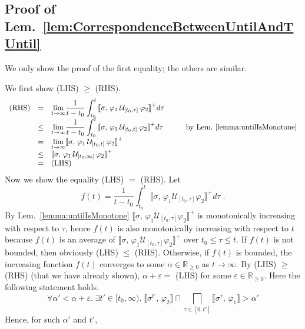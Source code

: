 \documentclass[envcountsect,orivec]{llncs} \usepackage{etex} \usepackage[]{graphicx}
\newcommand{\R}{{\mathbb{R}}}
\newcommand{\UntilOp}[1]{\mathbin{\mathcal{U}_{#1}}}
\newcommand{\Robust}[2]{{ \llbracket #1,\, #2 \rrbracket}}
\newcommand{\Lim}[1]{{\displaystyle{\lim_{#1}}}}
\newcommand{\Wedge}[1]{{{\bigsqcap_{#1}}}}
\newcommand{\Frac}[2]{{\displaystyle{\frac{#1}{#2}}}}
\newcommand{\Int}{\displaystyle \int}
\newcommand{\Rnn}{\R_{\ge 0}}
\begin{document}
\subsection{Proof of Lem.~\ref{lem:CorrespondenceBetweenUntilAndTUntil}}
\begin{myproof}
  We only show the proof of the first equality; the others are similar.
  
  We  first show (LHS) $\geq$ (RHS).
  \[
  \begin{array}{rlll}
    \text{(RHS)} 
    & = 
    & \Lim{t \to \infty} 
      \Frac{1}{t-t_0} \Int_{t_0}^{t} 
      \Robust{\sigma}{\varphi_1 \UntilOp{[t_0, \tau]} \varphi_2}^{+} d\tau 
    & \\
    & \leq 
    & \Lim{t \to \infty} \Frac{1}{t-t_0} \Int_{t_0}^{t}
      \Robust{\sigma}{\varphi_1 \UntilOp{[t_0, t]} \varphi_2}^{+} d\tau \qquad
    & \text{by Lem.~\ref{lemma:untilIsMonotone}}\\
    & = 
    & \Lim{t \to \infty}
      \Robust{\sigma}{\varphi_1\UntilOp{[t_0, t]}\varphi_2}^{+}
    &\\
    & \leq 
    & \Robust{\sigma}{\varphi_1\UntilOp{[t_0, \infty]}\varphi_2}^{+}&\\
    & = 
    & \text{(LHS)} 
    & \\ 
  \end{array}
  \]
  Now we show the equality (LHS) $=$ (RHS).
  Let 
  \[
    f(t) = 
    \Frac{1}{t-t_0} \Int_{t_0}^{t} 
    \Robust{\sigma}{\varphi_1 \UntilOp{[t_0, \tau]} \varphi_2}^{+} d\tau \;.
  \]
  By Lem.~\ref{lemma:untilIsMonotone}
  $\Robust{\sigma}{\varphi_1 \UntilOp{[t_0, \tau]} \varphi_2}^{+}$
  is monotonically increasing with respect to $\tau$,
  hence $f(t)$ is also monotonically increasing with respect to $t$
  because $f(t)$ is an average of $\Robust{\sigma}{\varphi_1 \UntilOp{[t_0, \tau]} \varphi_2}^{+}$
  over $t_0 \leq \tau \leq t$.
  If $f(t)$ is not bounded, then obviously (LHS) $\leq$ (RHS).
  Otherwise, if $f(t)$ is bounded,
the increasing function $f(t)$
  converges to some $\alpha \in \Rnn$ as $t\to\infty$.
By (LHS) $\geq$ (RHS) (that we have already shown),
  $\alpha + \varepsilon = $ (LHS) for some $\varepsilon \in \Rnn$.
  Here the following statement holds.
  \begin{equation}\label{eq:boundOfRHS}
    \forall \alpha' < \alpha + \varepsilon. \;
    \exists t' \in [t_0, \infty). \;
    \Robust{\sigma^{t'}}{\varphi_2} \sqcap
    \Wedge{\tau \in [0, t']} \Robust{\sigma^{\tau}}{\varphi_1} > \alpha'
  \end{equation}
  Hence, for such $\alpha'$ and $t'$,

\end{myproof}
\end{document}
